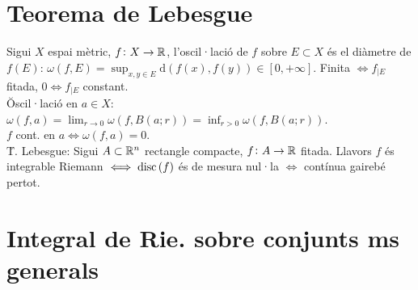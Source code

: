 \section{Teorema de Lebesgue}

\ci Sigui $X$ espai mètric, $f\colon X\to \mathbb{R}$, l'oscil·lació de $f$ sobre $E\subset X$ és el diàmetre de $f(E)$: $\omega(f,E) = \sup_{x,y\in E} \text{d}\left( f\left( x \right), f\left( y \right) \right) \in \left[ 0, +\infty \right]$. Finita $\iff f_{|E}$ fitada, $0\iff f_{|E}$ constant. \\
\u{Oscil·lació en $a\in X$}: $\omega\left( f,a \right) = \lim_{r\to 0}\omega\left( f, B\left( a;r \right) \right) = \inf_{r>0} \omega\left( f, B\left( a; r \right) \right)$. \\
\ci $f$ cont. en $a \iff \omega\left( f, a \right) = 0$. \\
\u{T. Lebesgue}: Sigui $A\subset \mathbb{R}^n$ rectangle compacte, $f\colon A\to \mathbb{R}$ fitada. Llavors $f$ és integrable Riemann $\iff \operatorname{disc}\left( f \right)$ és de mesura nul·la $\iff$ contínua gairebé pertot.

\section{Integral de Rie. sobre conjunts ms generals}

